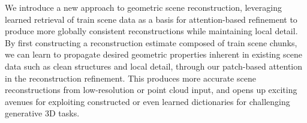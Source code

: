 We introduce a new approach to geometric scene reconstruction, leveraging learned retrieval of train scene data as a basis for attention-based refinement to produce more globally consistent reconstructions while maintaining local detail.
By first constructing a reconstruction estimate composed of train scene chunks, we can learn to propagate desired geometric properties inherent in existing scene data such as clean structures and local detail, through our patch-based attention in the reconstruction refinement.
This produces more accurate scene reconstructions from low-resolution or point cloud input, and opens up exciting avenues for exploiting constructed or even learned dictionaries for challenging generative 3D tasks.
